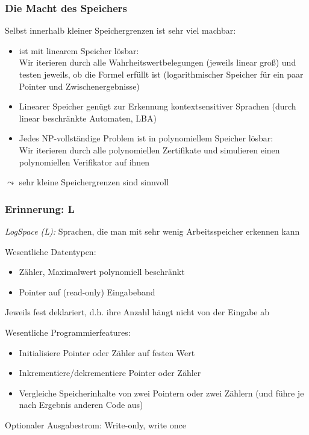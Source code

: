 \documentclass[aspectratio=1610,onlymath]{beamer}
\begin{document}
\begin{frame}\frametitle{Die Macht des Speichers}

Selbst innerhalb kleiner Speichergrenzen ist sehr viel machbar:\pause
\begin{itemize}
\item {} ist mit linearem Speicher lösbar:\\
Wir iterieren durch alle Wahrheitswertbelegungen (jeweils linear groß) und
testen jeweils, ob die Formel erfüllt ist (logarithmischer Speicher für ein paar Pointer und Zwischenergebnisse)\pause
\item Linearer Speicher genügt zur Erkennung kontextsensitiver Sprachen (durch linear beschränkte Automaten, LBA)\pause
\item Jedes NP-vollständige Problem ist in polynomiellem Speicher lösbar:\\
Wir iterieren durch alle polynomiellen Zertifikate und simulieren einen polynomiellen
Verifikator auf ihnen
\end{itemize}

$\leadsto$ sehr kleine Speichergrenzen sind sinnvoll

\end{frame}

\begin{frame}\frametitle{Erinnerung: L}

\emph{LogSpace (L):} Sprachen, die man mit sehr wenig Arbeitsspeicher erkennen kann
\bigskip

\alert{Wesentliche Datentypen:} 
\begin{itemize}
\item Zähler, Maximalwert polynomiell beschränkt
\item Pointer auf (read-only) Eingabeband
\end{itemize}
{\tiny Jeweils fest deklariert, d.h. ihre Anzahl hängt nicht von der Eingabe ab

}
\bigskip

\alert{Wesentliche Programmierfeatures:}
\begin{itemize}
\item Initialisiere Pointer oder Zähler auf festen Wert
\item Inkrementiere/dekrementiere Pointer oder Zähler
\item Vergleiche Speicherinhalte von zwei Pointern oder zwei Zählern (und führe je nach Ergebnis anderen Code aus)
\end{itemize}
\bigskip

\alert{Optionaler Ausgabestrom:} Write-only, write once 

\end{frame}
\end{document}
